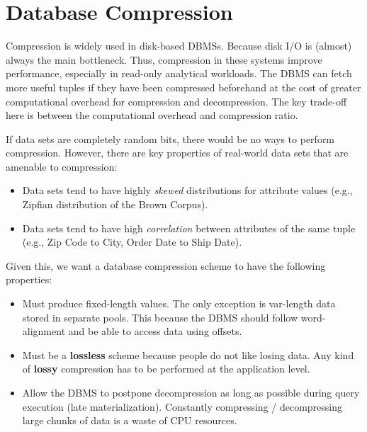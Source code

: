 \documentclass[11pt]{article}
\begin{document}
\maketitle
\thispagestyle{plain}

\section{Database Compression}
Compression is widely used in disk-based DBMSs. Because disk I/O is (almost) always the main bottleneck. Thus, compression in these systems improve performance, especially in read-only analytical workloads. The DBMS can fetch more useful tuples if they have been compressed beforehand at the cost of greater computational overhead for compression and decompression. The key trade-off here is between the computational overhead and compression ratio.


If data sets are completely random bits, there would be no ways to perform compression. However, there are key properties of real-world data sets that are amenable to compression:
\begin{itemize}
    \item
    Data sets tend to have highly \textit{skewed} distributions for attribute values (e.g., Zipfian distribution of the Brown Corpus).
    
    \item
    Data sets tend to have high \textit{correlation} between attributes of the same 
    tuple (e.g., Zip Code to City, Order Date to Ship Date).
\end{itemize}

Given this, we want a database compression scheme to have the following properties:
\begin{itemize}
    \item
    Must produce fixed-length values. The only exception is var-length data stored in separate pools. This because the DBMS should follow word-alignment and be able to access data using offsets.

    \item
    Must be a \textbf{lossless} scheme because people do not like losing data. 
    Any kind of \textbf{lossy} compression has to be performed at the application level.
    
    \item
    Allow the DBMS to postpone decompression as long as possible during query execution (late materialization). Constantly compressing / decompressing large chunks of data is a waste of CPU resources.
\end{itemize}
\end{document}
